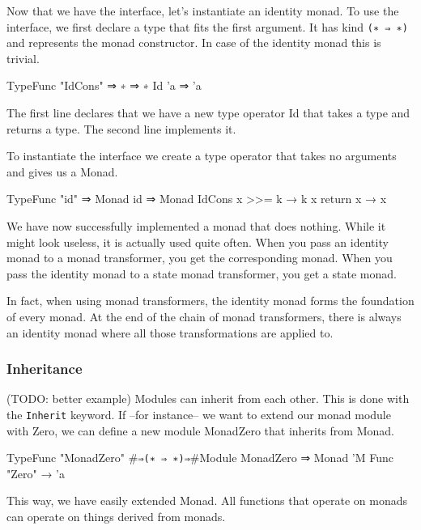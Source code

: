   Now that we have the interface, let's instantiate an identity monad.
  To use the interface, we first declare a type that fits the first argument.
  It has kind \verb|(∗ ⇒ ∗)| and represents the monad constructor.
  In case of the identity monad this is trivial.

  \begin{code}
  TypeFunc "IdCons" ⇒ ∗ ⇒ ∗
  Id 'a ⇒ 'a
  \end{code}

  The first line declares that we have a new type operator Id that takes a type and returns a type.
  The second line implements it. 

  To instantiate the interface we create a type operator that takes no arguments and gives us a Monad.
  
  \begin{code}
  TypeFunc "id" ⇒ Monad 
  id ⇒ Monad IdCons {
    x >>= k → k x
    return x → x
  }
  \end{code}

  We have now successfully implemented a monad that does nothing.
  While it might look useless, it is actually used quite often.
  When you pass an identity monad to a monad transformer, you get the corresponding monad.
  When you pass the identity monad to a state monad transformer, you get a state monad.

  In fact, when using monad transformers, the identity monad forms the foundation of every monad.
  At the end of the chain of monad transformers, there is always an identity monad where all those transformations are applied to.
  
  \subsubsection*{Inheritance}
  (TODO: better example)
  Modules can inherit from each other.
  This is done with the \verb|Inherit| keyword. 
  If --for instance-- we want to extend our monad module with Zero,
  we can define a new module MonadZero that inherits from Monad.

  \begin{code}
  TypeFunc "MonadZero" #\verb|⇒(∗ ⇒ ∗)⇒|#Module
  MonadZero ⇒ Monad 'M {
    Func "Zero" → 'a
  }
  \end{code}

  This way, we have easily extended Monad.
  All functions that operate on monads can operate on things derived from monads.
